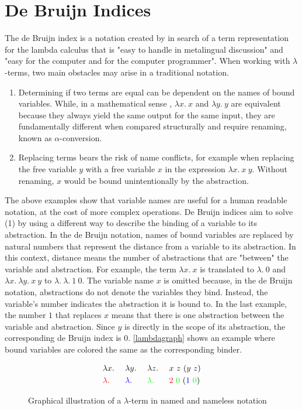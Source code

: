 \documentclass[a4paper, 11pt, fleqn]{scrreprt}
\begin{document}
	\section{De Bruijn Indices}
	\label{motivations}
	The de Bruijn index is a notation created by \citet{DeBruijn} in search of a term representation for the lambda calculus that is "easy to handle in metalingual discussion" and "easy for the computer and for the computer programmer". When working with $\lambda$-terms, two main obstacles may arise in a traditional notation.
	\begin{enumerate}[label={(\arabic*)}]
		\item Determining if two terms are equal can be dependent on the names of bound variables. While, in a mathematical sense , $\lambda x. \ x$ and $\lambda y. \ y$ are equivalent because they always yield the same output for the same input, they are fundamentally different when compared structurally and require renaming, known as $\alpha$-conversion.
		\item Replacing terms bears the risk of name conflicts, for example when replacing the free variable $y$ with a free variable $x$ in the expression $\lambda x . \ x \ y$. Without renaming, $x$ would be bound unintentionally by the abstraction.
	\end{enumerate}
	The above examples show that variable names are useful for a human readable notation, at the cost of more complex operations. De Bruijn indices aim to solve (1) by using a different way to describe the binding of a variable to its abstraction. In the de Bruijn notation, names of bound variables are replaced by natural numbers that represent the distance from a variable to its abstraction. In this context, distance means the number of abstractions that are "between" the variable and abstraction. For example, the term $\lambda x. \ x$ is translated to $\lambda. \ 0$ and $\lambda x.\ \lambda y. \ x \ y$ to $\lambda. \ \lambda. \ 1 \ 0$. The variable name $x$ is omitted because, in the de Bruijn notation, abstractions do not denote the variables they bind. Instead, the variable's number indicates the abstraction it is bound to. In the last example, the number $1$ that replaces $x$ means that there is one abstraction between the variable and abstraction. Since $y$ is directly in the scope of its abstraction, the corresponding de Bruijn index is $0$. \autoref{lambdagraph} shows an example where bound variables are colored the same as the corresponding binder.
	
	\begin{figure}[H]
		\begin{alignat*}{4}
		&\lambda x. \ &&\lambda y. \ &&\lambda z. \ &&x \ z \ (y \ z)\\ 
		&\textcolor{red}{\lambda.} \ &&\textcolor{blue}{\lambda.}  &&\textcolor{green}{\lambda.}  &&\textcolor{red}{2} \ \textcolor{green}{0} \ (\textcolor{blue}{1} \  \textcolor{green}{0})
		\end{alignat*}
	\caption{Graphical illustration of a $\lambda$-term in named and nameless notation}
	\label{lambdagraph}
	\end{figure}
	
\end{document}
